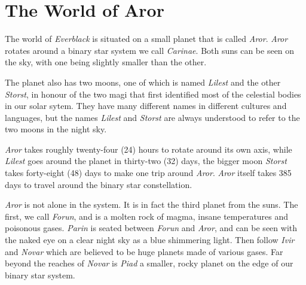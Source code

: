 \chapter{The World of Aror}
\label{sec:Aror}

The world of \emph{Everblack} is situated on a small planet that is
called \emph{Aror}. \emph{Aror} rotates around a binary star system we
call \emph{Carinae}. Both suns can be seen on the sky, with one being
slightly smaller than the other.

The planet also has two moons, one of which is named \emph{Lilest} and
the other \emph{Storst}, in honour of the two magi that first
identified most of the celestial bodies in our solar sytem. They have
many different names in different cultures and languages, but the
names \emph{Lilest} and \emph{Storst} are always understood to refer
to the two moons in the night sky.

\emph{Aror} takes roughly twenty-four (24) hours to rotate around its
own axis, while \emph{Lilest} goes around the planet in thirty-two
(32) days, the bigger moon \emph{Storst} takes forty-eight (48) days
to make one trip around \emph{Aror}. \emph{Aror} itself takes 385 days
to travel around the binary star constellation.

\emph{Aror} is not alone in the system. It is in fact the third planet
from the suns. The first, we call \emph{Forun}, and is a molten rock
of magma, insane temperatures and poisonous gases. \emph{Parin} is
seated between \emph{Forun} and \emph{Aror}, and can be seen with the
naked eye on a clear night sky as a blue shimmering light. Then follow
\emph{Ivir} and \emph{Novar} which are believed to be huge planets made
of various gases. Far beyond the reaches of \emph{Novar} is
\emph{Piad} a smaller, rocky planet on the edge of our binary star
system.



%
\newpage

\newpage












